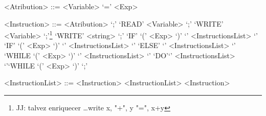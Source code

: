 \documentclass{article}
\begin{document}
\begin{grammar}
<Atribution> ::=  <Variable> `=' <Exp> 

<Instruction> ::= <Atribution> `;' 
\alt `READ'  <Variable> `;'
\alt `WRITE' <Variable> `;'\footnote{JJ: talvez enriquecer \ldots write x, "+",
y "=", x+y}                      
\alt `WRITE' <string> `;'
\alt `IF' `(' <Exp> `)' `{' <InstructionsList> `}' 
\alt `IF' `(' <Exp> `)' `{' <InstructionsList> `}' `ELSE' `{' <InstructionsList> `}' 
\alt `WHILE `(' <Exp> `)' `{' <InstructionsList> `}' 
\alt `DO'`{' <InstructionsList> `}'`WHILE `(' <Exp> `)' `;' 

<InstructionList> ::= <Instruction>
\alt <InstructionList> <Instruction>  

\end{grammar}
\end{document}
